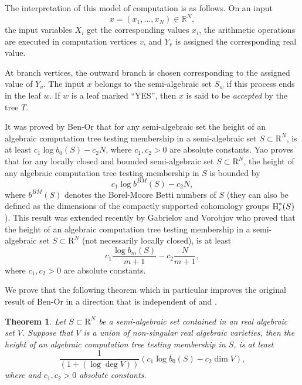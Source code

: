 \documentclass[10pt]{amsart}
\newtheorem{theorem}{Theorem}
\theoremstyle{definition}
\theoremstyle{remark}
\numberwithin{equation}{section}
\newcommand {\R} {\mathrm{R}}
\newcommand{\HH}  {\mbox{\rm H}}
\begin{document}
The interpretation of this model of computation is as follows. On an input
\[
x = (x_1,\ldots,x_N) \in \mathbb{R}^N,
\]
the input variables $X_i$ get the corresponding values $x_i$,
the arithmetic operations are executed in computation vertices $v$, and 
$Y_v$ is assigned the corresponding real value.

At branch vertices, the outward branch is chosen corresponding to the assigned value of $Y_v$. 
The input $x$ belongs to the semi-algebraic set $S_w$ if this process ends in the leaf $w$. If $w$ is a leaf marked ``YES'', then $x$ is said to be \emph{accepted} by the tree $T$.

It was proved by Ben-Or \cite{Ben-Or} that for any semi-algebraic set
the height of an algebraic computation tree testing membership in a semi-algebraic set $S \subset \R^N$, is at least 
$c_1 \log b_0(S) - c_2 N$, where
$c_1,c_2 > 0$ are absolute constants. 
Yao \cite{Yao}
proves that for any locally closed and bounded semi-algebraic set
$S \subset \R^N$, the height of any algebraic computation tree testing membership in $S$ is bounded by
\[
c_1 \log b^{BM}(S) - c_2 N,
\]
where $b^{BM}(S)$ denotes the Borel-Moore Betti numbers of $S$ (they can also be defined as the dimensions of the compactly supported cohomology groups $\HH_c^*(S)$).
This result was extended recently  by Gabrielov and Vorobjov \cite{GV2017} who proved that the height of an algebraic computation tree testing membership in a semi-algebraic set $S \subset \R^N$ (not necessarily locally closed), is at least 
\[
c_1 \frac{\log b_m(S)}{m+1} - c_2 \frac{N}{m+1},
\]
where $c_1,c_2 > 0$ are absolute constants. 

We prove that the following theorem which in particular improves the original result of
Ben-Or in a direction that is independent of \cite{Yao} and \cite{GV2017}.

\begin{theorem}
\label{thm:lower-bound}
Let $S \subset \R^N$ be a semi-algebraic set contained in an real algebraic set $V$.
Suppose that $V$ is a union of 
non-singular real algebraic varieties,
then the height of an algebraic computation tree testing membership in $S$, is at least 
\[
\frac{1}{(1+ (\log \deg V))} (c_1 \log b_0(S) - c_2 \dim V),
\]
where
and $c_1, c_2 > 0$ absolute constants.
\end{theorem}
\end{document}

